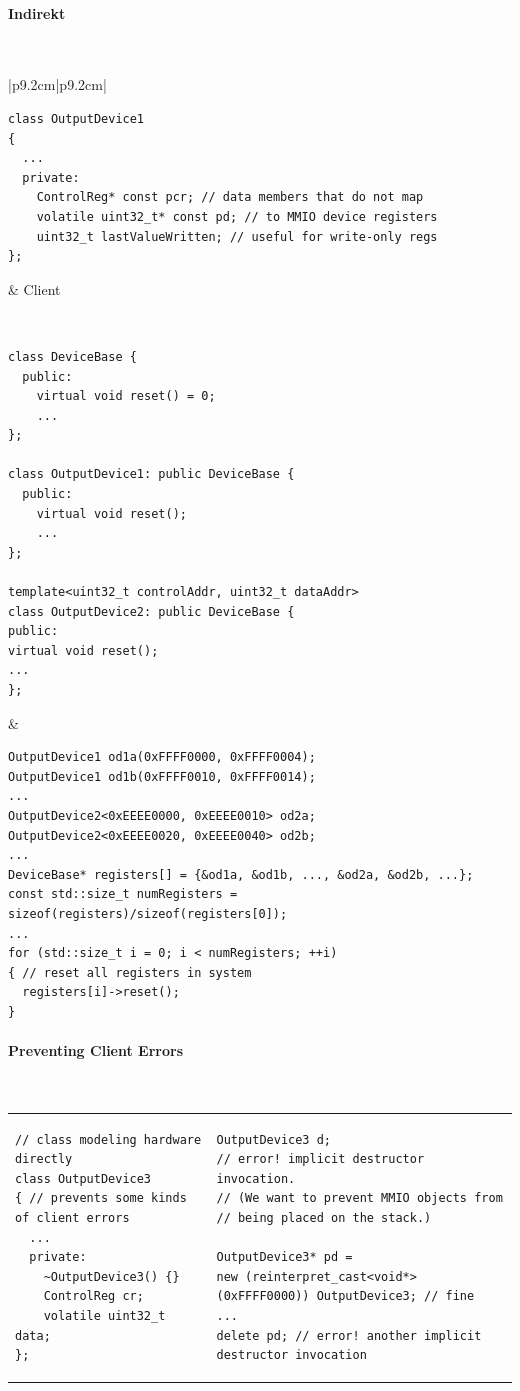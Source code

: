 \paragraph{Indirekt}~
\\
\begin{tabular}{|p{9.2cm}|p{9.2cm}|}
\begin{lstlisting}
class OutputDevice1
{
  ...
  private:
    ControlReg* const pcr; // data members that do not map
    volatile uint32_t* const pd; // to MMIO device registers
    uint32_t lastValueWritten; // useful for write-only regs
};
\end{lstlisting}
&
Client

\\
\hline
\begin{lstlisting}
class DeviceBase {
  public:
    virtual void reset() = 0;
    ...
};

class OutputDevice1: public DeviceBase {
  public:
    virtual void reset();
    ...
};

template<uint32_t controlAddr, uint32_t dataAddr>
class OutputDevice2: public DeviceBase {
public:
virtual void reset();
...
};
\end{lstlisting}
&
\begin{lstlisting}
OutputDevice1 od1a(0xFFFF0000, 0xFFFF0004);
OutputDevice1 od1b(0xFFFF0010, 0xFFFF0014);
...
OutputDevice2<0xEEEE0000, 0xEEEE0010> od2a;
OutputDevice2<0xEEEE0020, 0xEEEE0040> od2b;
...
DeviceBase* registers[] = {&od1a, &od1b, ..., &od2a, &od2b, ...};
const std::size_t numRegisters =
sizeof(registers)/sizeof(registers[0]);
...
for (std::size_t i = 0; i < numRegisters; ++i)
{ // reset all registers in system
  registers[i]->reset();
}
\end{lstlisting}
\end{tabular}

\paragraph{Preventing Client Errors}~

\begin{tabular}{|p{9.2cm}|p{9.2cm}|}
\begin{lstlisting}
// class modeling hardware directly
class OutputDevice3
{ // prevents some kinds of client errors
  ...
  private:
    ~OutputDevice3() {}
    ControlReg cr;
    volatile uint32_t data;
};
\end{lstlisting}
&
\begin{lstlisting}
OutputDevice3 d;
// error! implicit destructor invocation.
// (We want to prevent MMIO objects from
// being placed on the stack.)

OutputDevice3* pd =
new (reinterpret_cast<void*>(0xFFFF0000)) OutputDevice3; // fine
...
delete pd; // error! another implicit destructor invocation
\end{lstlisting}
\end{tabular}

